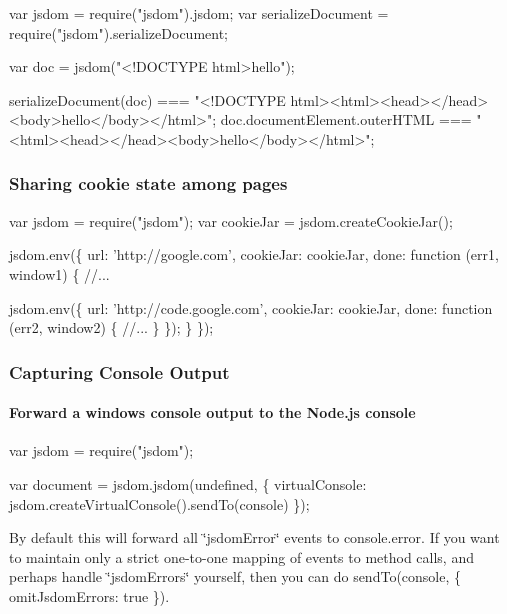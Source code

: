 \begin{DoxyCode}
var jsdom = require("jsdom").jsdom;
var serializeDocument = require("jsdom").serializeDocument;

var doc = jsdom("<!DOCTYPE html>hello");

serializeDocument(doc) === "<!DOCTYPE html><html><head></head><body>hello</body></html>";
doc.documentElement.outerHTML === "<html><head></head><body>hello</body></html>";
\end{DoxyCode}


\subsubsection*{Sharing cookie state among pages}


\begin{DoxyCode}
var jsdom = require("jsdom");
var cookieJar = jsdom.createCookieJar();

jsdom.env(\{
    url: 'http://google.com',
    cookieJar: cookieJar,
    done: function (err1, window1) \{
        //...

        jsdom.env(\{
            url: 'http://code.google.com',
            cookieJar: cookieJar,
            done: function (err2, window2) \{
                //...
            \}
        \});
    \}
\});
\end{DoxyCode}


\subsubsection*{Capturing Console Output}

\paragraph*{Forward a window\textquotesingle{}s console output to the Node.\+js console}


\begin{DoxyCode}
var jsdom = require("jsdom");

var document = jsdom.jsdom(undefined, \{
  virtualConsole: jsdom.createVirtualConsole().sendTo(console)
\});
\end{DoxyCode}


By default this will forward all {\ttfamily \char`\"{}jsdom\+Error\char`\"{}} events to {\ttfamily console.\+error}. If you want to maintain only a strict one-\/to-\/one mapping of events to method calls, and perhaps handle {\ttfamily \char`\"{}jsdom\+Errors\char`\"{}} yourself, then you can do {\ttfamily send\+To(console, \{ omit\+Jsdom\+Errors\+: true \})}.

